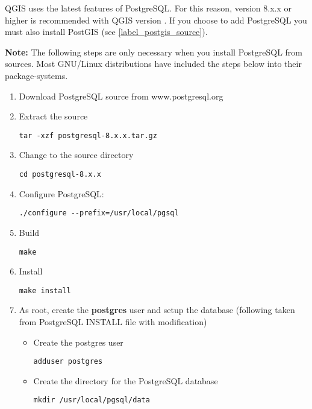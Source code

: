QGIS uses the latest features of PostgreSQL. For this reason, version
8.x.x or higher is recommended with QGIS version \CURRENT. If you
choose to add PostgreSQL you must also install PostGIS (see \ref{label_postgis_source}). 

\textbf{Note:} The following steps are only necessary when you install PostgreSQL
from sources. Most GNU/Linux distributions have included the steps below into
their package-systems.

\begin{enumerate}
\item Download PostgreSQL source from www.postgresql.org \cite{Postgreweb} 
\item Extract the source 
\begin{verbatim}
tar -xzf postgresql-8.x.x.tar.gz
\end{verbatim}

\item Change to the source directory 
\begin{verbatim}
cd postgresql-8.x.x
\end{verbatim}

\item Configure PostgreSQL:
\begin{verbatim}
./configure --prefix=/usr/local/pgsql 
\end{verbatim}

\item Build
\begin{verbatim}
make
\end{verbatim}

\item Install
\begin{verbatim}
make install
\end{verbatim}

\item As root, create the \textbf{postgres} user and setup the database (following
taken from PostgreSQL INSTALL file with modification)
\begin{itemize} 
\item Create the postgres user 
\begin{verbatim}
adduser postgres
\end{verbatim}

\item Create the directory for the PostgreSQL database 
\begin{verbatim}
mkdir /usr/local/pgsql/data
\end{verbatim}


\end{itemize}
\end{enumerate}
